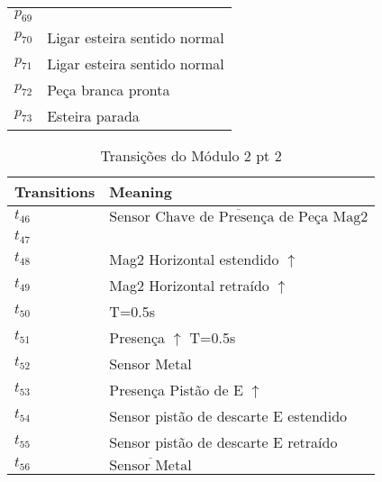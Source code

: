 \begin{table}[htbp]
\begin{tabular}{ll}
\hyperlink{partialNet:p69}{\hypertarget{partialTable:p69}{$p_{69}$}} & \\
\hyperlink{partialNet:p70}{\hypertarget{partialTable:p70}{$p_{70}$}} & Ligar esteira sentido normal\\
\hyperlink{partialNet:p71}{\hypertarget{partialTable:p71}{$p_{71}$}} & Ligar esteira sentido normal\\
\hyperlink{partialNet:p72}{\hypertarget{partialTable:p72}{$p_{72}$}} & Peça branca pronta\\
\hyperlink{partialNet:p73}{\hypertarget{partialTable:p73}{$p_{73}$}} & Esteira parada\\
\end{tabular}
\end{table}

\begin{table}[htbp]
\caption{Transições do Módulo 2 pt 2}
\centering
\begin{tabular}{ll}
Transitions & Meaning\\
\hline
\hyperlink{partialNet:t46}{\hypertarget{partialTable:t46}{$t_{46}$}} & \(\overline{\mbox{Sensor Chave de Presença de Peça Mag2}}\)\\
\hyperlink{partialNet:t47}{\hypertarget{partialTable:t47}{$t_{47}$}} & \\
\hyperlink{partialNet:t48}{\hypertarget{partialTable:t48}{$t_{48}$}} & Mag2 Horizontal estendido \(\uparrow\)\\
\hyperlink{partialNet:t49}{\hypertarget{partialTable:t49}{$t_{49}$}} & Mag2 Horizontal retraído \(\uparrow\)\\
\hyperlink{partialNet:tt50}{\hypertarget{partialTable:tt50}{$t_{50}$}} & T=0.5s\\
\hyperlink{partialNet:tt51}{\hypertarget{partialTable:tt51}{$t_{51}$}} & Presença \(\uparrow\) T=0.5s\\
\hyperlink{partialNet:t52}{\hypertarget{partialTable:t52}{$t_{52}$}} & Sensor Metal\\
\hyperlink{partialNet:t53}{\hypertarget{partialTable:t53}{$t_{53}$}} & Presença Pistão de E \(\uparrow\)\\
\hyperlink{partialNet:t54}{\hypertarget{partialTable:t54}{$t_{54}$}} & Sensor pistão de descarte E estendido\\
\hyperlink{partialNet:t55}{\hypertarget{partialTable:t55}{$t_{55}$}} & Sensor pistão de descarte E retraído\\
\hyperlink{partialNet:t56}{\hypertarget{partialTable:t56}{$t_{56}$}} & \(\overline{\mbox{Sensor Metal}}\)\\

\end{tabular}
\end{table}
